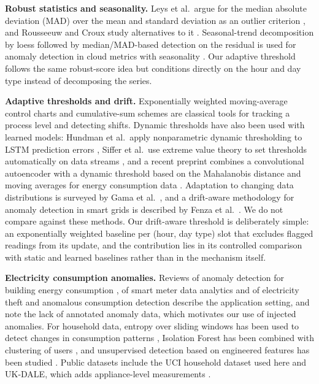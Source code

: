 \documentclass[conference]{IEEEtran}
\begin{document}
\textbf{Robust statistics and seasonality.} Leys et al.\ argue for the median absolute deviation (MAD) over the mean and standard deviation as an outlier criterion \cite{leys2013}, and Rousseeuw and Croux study alternatives to it \cite{rousseeuw1993}. Seasonal-trend decomposition by loess \cite{cleveland1990} followed by median/MAD-based detection on the residual is used for anomaly detection in cloud metrics with seasonality \cite{hochenbaum2017}. Our adaptive threshold follows the same robust-score idea but conditions directly on the hour and day type instead of decomposing the series.

\textbf{Adaptive thresholds and drift.} Exponentially weighted moving-average control charts \cite{roberts1959} and cumulative-sum schemes \cite{page1954} are classical tools for tracking a process level and detecting shifts. Dynamic thresholds have also been used with learned models: Hundman et al.\ apply nonparametric dynamic thresholding to LSTM prediction errors \cite{hundman2018}, Siffer et al.\ use extreme value theory to set thresholds automatically on data streams \cite{siffer2017}, and a recent preprint combines a convolutional autoencoder with a dynamic threshold based on the Mahalanobis distance and moving averages for energy consumption data \cite{maitra2024}. Adaptation to changing data distributions is surveyed by Gama et al.\ \cite{gama2014}, and a drift-aware methodology for anomaly detection in smart grids is described by Fenza et al.\ \cite{fenza2019}. We do not compare against these methods. Our drift-aware threshold is deliberately simple: an exponentially weighted baseline per (hour, day type) slot that excludes flagged readings from its update, and the contribution lies in its controlled comparison with static and learned baselines rather than in the mechanism itself.

\textbf{Electricity consumption anomalies.} Reviews of anomaly detection for building energy consumption \cite{himeur2021}, of smart meter data analytics \cite{wang2019} and of electricity theft and anomalous consumption detection \cite{nayak2025} describe the application setting, and note the lack of annotated anomaly data, which motivates our use of injected anomalies. For household data, entropy over sliding windows has been used to detect changes in consumption patterns \cite{mouregarrido2022}, Isolation Forest has been combined with clustering of users \cite{wang2024}, and unsupervised detection based on engineered features has been studied \cite{zhang2020}. Public datasets include the UCI household dataset used here \cite{hebrail2006} and UK-DALE, which adds appliance-level measurements \cite{kelly2015}.
\end{document}
